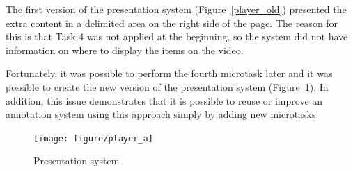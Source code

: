 \begin{itemize}
The first version of the presentation system (Figure~\ref{player_old}) presented the extra content in a delimited area on the right side of the page. The reason for this is that Task 4 was not applied at the beginning, so the system did not have information on where to display the items on the video.

Fortunately, it was possible to perform the fourth microtask later and it was possible to create the new version of the presentation system (Figure~\ref{player_a}). In addition, this issue demonstrates that it is possible to reuse or improve an annotation system using this approach simply by adding new microtasks.

\begin{figure}[h]
	\centerline{\texttt{[image: figure/player\_a]}}
	\caption{Presentation system}
	\label{player_a}
\end{figure} 

	
		
	\end{itemize}
	
	
	
	
	
	
	
